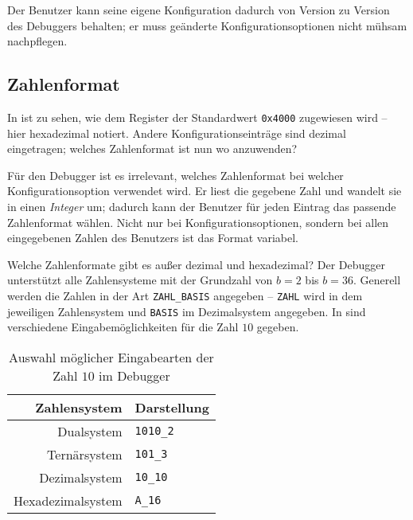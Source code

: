 Der Benutzer kann seine eigene Konfiguration dadurch von Version zu Version des Debuggers behalten; er muss geänderte Konfigurationsoptionen nicht mühsam nachpflegen.

\subsection{Zahlenformat}
In  ist zu sehen, wie dem Register  der Standardwert \texttt{0x4000} zugewiesen wird -- hier hexadezimal notiert. Andere Konfigurationseinträge sind dezimal eingetragen; welches Zahlenformat ist nun wo anzuwenden?

Für den Debugger ist es irrelevant, welches Zahlenformat bei welcher Konfigurationsoption verwendet wird. Er liest die gegebene Zahl und wandelt sie in einen \emph{Integer} um; dadurch kann der Benutzer für jeden Eintrag das passende Zahlenformat wählen. Nicht nur bei Konfigurationsoptionen, sondern bei allen eingegebenen Zahlen des Benutzers ist das Format variabel.

Welche Zahlenformate gibt es außer dezimal und hexadezimal? Der Debugger unterstützt alle Zahlensysteme mit der Grundzahl von $b=2$ bis $b=36$. Generell werden die Zahlen in der Art \texttt{ZAHL\_BASIS} angegeben -- \texttt{ZAHL} wird in dem jeweiligen Zahlensystem und \texttt{BASIS} im Dezimalsystem angegeben. In  sind verschiedene Eingabemöglichkeiten für die Zahl $10$ gegeben.

\begin{table}[h]
  \centering
  \begin{tabular}[h]{|rl|}
    \hline
    \textbf{Zahlensystem} & \textbf{Darstellung}\\
    \hline
    Dualsystem        & \texttt{1010\_2}\\
    Ternärsystem      & \texttt{101\_3}\\
    Dezimalsystem     & \texttt{10\_10}\\
    Hexadezimalsystem & \texttt{A\_16}\\
    \hline
  \end{tabular}
  \caption{Auswahl möglicher Eingabearten der Zahl $10$ im Debugger}
\end{table}


